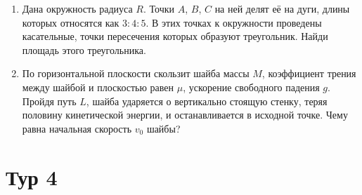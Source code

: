 \documentclass[12pt]{article} %
\begin{document}
\begin{enumerate}
\item  Дана окружность радиуса $R$. Точки $A$, $B$, $C$ на ней делят её на дуги, длины которых относятся как $3:4:5$. 
В этих точках к окружности проведены касательные, точки пересечения которых образуют треугольник. 
Найди площадь этого треугольника.

\item По горизонтальной плоскости скользит шайба массы $M$, коэффициент трения между шайбой и плоскостью равен $\mu$, 
ускорение свободного падения $g$. Пройдя путь $L$, шайба ударяется о вертикально стоящую стенку, 
теряя половину кинетической энергии, и останавливается в исходной точке. Чему равна начальная скорость $v_0$ шайбы?

\end{enumerate}
    


\section*{Тур 4}
\end{document}
